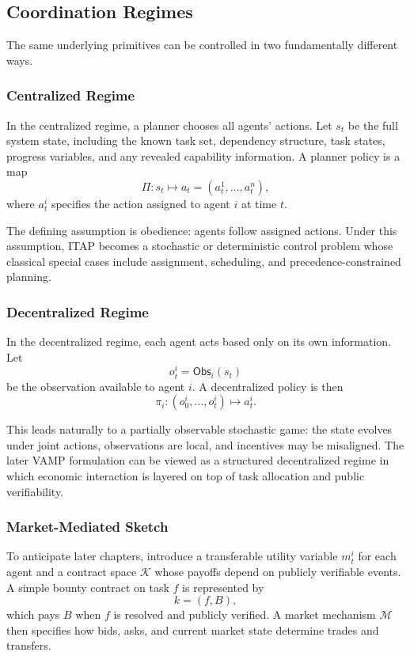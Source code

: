 \subsection{Coordination Regimes}

The same underlying primitives can be controlled in two fundamentally different ways.

\subsubsection{Centralized Regime}

In the centralized regime, a planner chooses all agents' actions. Let \(s_t\) be the full system state, including the known task set, dependency structure, task states, progress variables, and any revealed capability information. A planner policy is a map
\[
  \Pi : s_t \mapsto a_t = (a_t^1,\dots,a_t^n),
\]
where \(a_t^i\) specifies the action assigned to agent \(i\) at time \(t\).

The defining assumption is obedience: agents follow assigned actions. Under this assumption, ITAP becomes a stochastic or deterministic control problem whose classical special cases include assignment, scheduling, and precedence-constrained planning.

\subsubsection{Decentralized Regime}

In the decentralized regime, each agent acts based only on its own information. Let
\[
  o_t^i = \mathsf{Obs}_i(s_t)
\]
be the observation available to agent \(i\). A decentralized policy is then
\[
  \pi_i : (o_0^i,\dots,o_t^i) \mapsto a_t^i.
\]

This leads naturally to a partially observable stochastic game: the state evolves under joint actions, observations are local, and incentives may be misaligned. The later VAMP formulation can be viewed as a structured decentralized regime in which economic interaction is layered on top of task allocation and public verifiability.

\subsubsection{Market-Mediated Sketch}

To anticipate later chapters, introduce a transferable utility variable \(m_t^i\) for each agent and a contract space \(\mathcal{K}\) whose payoffs depend on publicly verifiable events. A simple bounty contract on task \(f\) is represented by
\[
  k = (f,B),
\]
which pays \(B\) when \(f\) is resolved and publicly verified. A market mechanism \(\mathcal{M}\) then specifies how bids, asks, and current market state determine trades and transfers.

